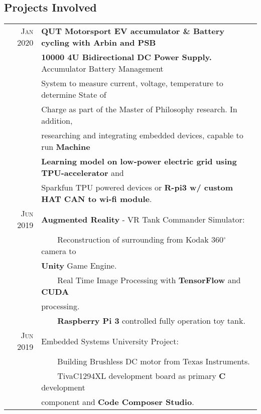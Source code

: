\documentclass[a4paper,12pt]{article}
\newcommand{\tabitem}{~~\llap{\textbullet}~~}
\begin{document}
{\subsection{Projects Involved}
	\begin{tabular}{rl}
	    \textsc{Jan} 2020 & \textbf{QUT Motorsport EV accumulator \& Battery cycling with Arbin and PSB} \\
	    & \textbf{10000 4U Bidirectional DC Power Supply.} Accumulator Battery Management \\
	    & System to measure current, voltage, temperature to determine State of \\
	    & Charge as part of the Master of Philosophy research. In addition, \\
	    & researching and integrating embedded devices, capable to run \textbf{Machine} \\
	    & \textbf{Learning model on low-power electric grid using TPU-accelerator} and \\
	    & Sparkfun TPU powered devices or \textbf{R-pi3 w/ custom HAT CAN to wi-fi module}. \\
	    \textsc{Jun} 2019 & \textbf{Augmented Reality} - VR Tank Commander Simulator: \\
	        & \tabitem Reconstruction of surrounding from Kodak 360$^{\circ}$ camera to \\
	        & \textbf{Unity} Game Engine. \\ %
	        & \tabitem Real Time Image Processing with \textbf{TensorFlow} and \textbf{CUDA} \\
	        & processing. \\
	        & \tabitem \textbf{Raspberry Pi 3} controlled fully operation toy tank. \\ [1pc]
	        
        \textsc{Jun} 2019 & Embedded Systems University Project: \\
            & \tabitem Building Brushless DC motor from Texas Instruments. \\
            & \tabitem TivaC1294XL development board as primary \textbf{C} development \\
            & component and \textbf{Code Composer Studio}. \\ [1pc]
            

\end{tabular}}
\end{document}
